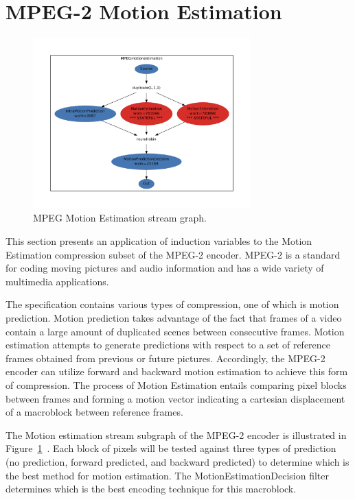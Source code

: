 \section{MPEG-2 Motion Estimation}
\label{sec:mpeg}

\begin{figure}[t]
\includegraphics[width=3.3in]{figures/work_estimate_mpeg_motionestimation.pdf}
\caption{MPEG Motion Estimation stream graph.\protect\label{fig:mpegMEgraph}}
\end{figure}


This section presents an application of induction variables to the Motion Estimation compression subset of the MPEG-2 encoder.  MPEG-2 is a standard for coding moving pictures and audio information and has a wide variety of multimedia applications.  

The specification contains various types of compression, one of which is motion prediction.  Motion prediction takes advantage of the fact that frames of a video contain a large amount of duplicated scenes between consecutive frames.  Motion estimation attempts to generate predictions with respect to a set of reference frames obtained from previous or future pictures.  Accordingly, the MPEG-2 encoder can utilize forward and backward motion estimation to achieve this form of compression.  The process of Motion Estimation entails comparing pixel blocks between frames and forming a motion vector indicating a cartesian displacement of a macroblock between reference frames.  

The Motion estimation stream subgraph of the MPEG-2 encoder is illustrated in Figure~\ref{fig:mpegMEgraph}~\cite{drake-thesis}.  Each block of pixels will be tested against three types of prediction (no prediction, forward predicted, and backward predicted) to determine which is the best method for motion estimation.  The MotionEstimationDecision filter determines which is the best encoding technique for this macroblock.


